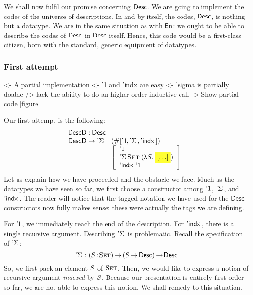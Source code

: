 We shall now fulfil our promise concerning $\Desc$. We are going to
implement the codes of the universe of descriptions. In and by itself,
the codes, $\Desc$, is nothing but a datatype. We are in the same
situation as with $\EnumU$: we ought to be able to describe the codes
of $\Desc$ in $\Desc$ itself. Hence, this code would be a first-class
citizen, born with the standard, generic equipment of datatypes.

\subsubsection{First attempt}

\begin{wstructure}
<- A partial implementation
    <- '1 and 'indx are easy
    <- 'sigma is partially doable
        /> lack the ability to do an higher-order inductive call
    -> Show partial code [figure]
\end{wstructure}

Our first attempt is the following:
%
\[\stk{
\DescD : \Desc \\
\begin{array}{@{}ll}
\DescD \mapsto \DSigma{\!}{\!} & (\EnumT{[ \DUnit, \DSigma{\!}{\!}, \DIndx{\!} ]})  \\
                               & \left[\begin{array}{l}
                                   \DUnit                                \\
                                   \DSigma{\Set}{(\LAM{\V{S}} \SHED)}      \\
                                   \DIndx{\DUnit}                        \\
                                 \end{array}
                                 \right]
\end{array}
}\]
%
Let us explain how we have proceeded and the obstacle we face. Much as
the datatypes we have seen so far, we first choose a constructor among
$\DUnit$, $\DSigma{\!}{\!}$, and $\DIndx{\!}$. The reader will notice
that the tagged notation we have used for the $\Desc$ constructors now
fully makes sense: these were actually the tags we are defining.

For $\DUnit$, we immediately reach the end of the description. For
$\DIndx{\!}$, there is a single recursive argument. Describing
$\DSigma{\!}{\!}$ is problematic. Recall the specification of
$\DSigma{\!}{\!}$:
%
\[    \DSigma{\!}{\!} : \PI{\V{S}}{\Set} \PIS{\V{S} \To \Desc} \Desc      \]
%
So, we first pack an element $\V{S}$ of $\Set$. Then, we would like to
express a notion of recursive argument \emph{indexed} by $\V{S}$. Because
our presentation is entirely first-order so far, we are not able to
express this notion. We shall remedy to this situation.


